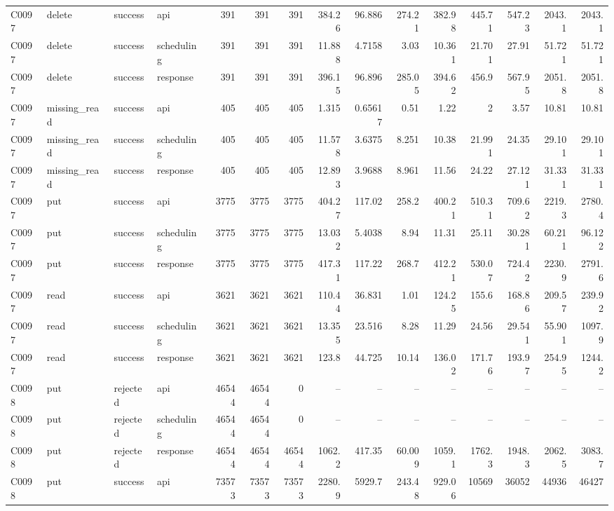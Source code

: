 \begin{landscape}
\begin{longtable}{llllrrrrrrrrrrr}
C0097 & delete & success & api & 391 & 391 & 391 & 384.26 & 96.886 & 274.21 & 382.98 & 445.71 & 547.23 & 2043.1 & 2043.1\\
C0097 & delete & success & scheduling & 391 & 391 & 391 & 11.888 & 4.7158 & 3.03 & 10.361 & 21.701 & 27.91 & 51.721 & 51.721\\
C0097 & delete & success & response & 391 & 391 & 391 & 396.15 & 96.896 & 285.05 & 394.62 & 456.9 & 567.95 & 2051.8 & 2051.8\\
C0097 & missing\_\allowbreak{}read & success & api & 405 & 405 & 405 & 1.315 & 0.65617 & 0.51 & 1.22 & 2 & 3.57 & 10.81 & 10.81\\
C0097 & missing\_\allowbreak{}read & success & scheduling & 405 & 405 & 405 & 11.578 & 3.6375 & 8.251 & 10.38 & 21.991 & 24.35 & 29.101 & 29.101\\
C0097 & missing\_\allowbreak{}read & success & response & 405 & 405 & 405 & 12.893 & 3.9688 & 8.961 & 11.56 & 24.22 & 27.121 & 31.331 & 31.331\\
C0097 & put & success & api & 3775 & 3775 & 3775 & 404.27 & 117.02 & 258.2 & 400.21 & 510.31 & 709.62 & 2219.3 & 2780.4\\
C0097 & put & success & scheduling & 3775 & 3775 & 3775 & 13.032 & 5.4038 & 8.94 & 11.31 & 25.11 & 30.281 & 60.211 & 96.122\\
C0097 & put & success & response & 3775 & 3775 & 3775 & 417.31 & 117.22 & 268.7 & 412.21 & 530.07 & 724.42 & 2230.9 & 2791.6\\
C0097 & read & success & api & 3621 & 3621 & 3621 & 110.44 & 36.831 & 1.01 & 124.25 & 155.6 & 168.86 & 209.57 & 239.92\\
C0097 & read & success & scheduling & 3621 & 3621 & 3621 & 13.355 & 23.516 & 8.28 & 11.29 & 24.56 & 29.541 & 55.901 & 1097.9\\
C0097 & read & success & response & 3621 & 3621 & 3621 & 123.8 & 44.725 & 10.14 & 136.02 & 171.76 & 193.97 & 254.95 & 1244.2\\
C0098 & put & rejected & api & 46544 & 46544 & 0 & -- & -- & -- & -- & -- & -- & -- & --\\
C0098 & put & rejected & scheduling & 46544 & 46544 & 0 & -- & -- & -- & -- & -- & -- & -- & --\\
C0098 & put & rejected & response & 46544 & 46544 & 46544 & 1062.2 & 417.35 & 60.009 & 1059.1 & 1762.3 & 1948.3 & 2062.5 & 3083.7\\
C0098 & put & success & api & 73573 & 73573 & 73573 & 2280.9 & 5929.7 & 243.48 & 929.06 & 10569 & 36052 & 44936 & 46427\\

\end{longtable}
\end{landscape}
